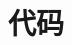\documentclass[withoutpreface,bwprint]{cumcmthesis} %
\begin{document}
\section{代码}
%
% 
% 
\end{document}
